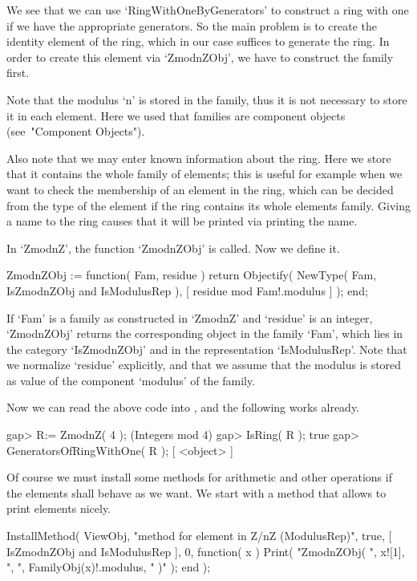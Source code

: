 We see that we can use `RingWithOneByGenerators' to construct a ring
with one if we have the appropriate generators.
So the main problem is to create the identity element of the ring,
which in our case suffices to generate the ring.
In order to create this element via `ZmodnZObj',
we have to construct the family first.

Note that the modulus `n' is stored in the family,
thus it is not necessary to store it in each element.
Here we used that families are component objects
(see~"Component Objects").

Also note that we may enter known information about the ring.
Here we store that it contains the whole family of elements;
this is useful for example when we want to check the membership of an
element in the ring, which can be decided from the type of the element
if the ring contains its whole elements family.
Giving a name to the ring causes that it will be printed
via printing the name.

In `ZmodnZ', the function `ZmodnZObj' is called.
Now we define it.

\begintt
    ZmodnZObj := function( Fam, residue )
        return Objectify( NewType( Fam, IsZmodnZObj and IsModulusRep ),
                          [ residue mod Fam!.modulus ] );
    end;
\endtt

If `Fam' is a family as constructed in `ZmodnZ'
and `residue' is an integer,
`ZmodnZObj' returns the corresponding object in the family `Fam',
which lies in the category `IsZmodnZObj' and in the representation
`IsModulusRep'.
Note that we normalize `residue' explicitly,
and that we assume that the modulus is stored as value of the component
`modulus' of the family.

Now we can read the above code into {\GAP},
and the following works already.

\begintt
    gap> R:= ZmodnZ( 4 );
    (Integers mod 4)
    gap> IsRing( R );
    true
    gap> GeneratorsOfRingWithOne( R );
    [ <object> ]
\endtt

Of course we must install some methods for arithmetic and other
operations if the elements shall behave as we want.
We start with a method that allows to print elements nicely.

\begintt
    InstallMethod( ViewObj,
        "method for element in Z/nZ (ModulusRep)",
        true,
        [ IsZmodnZObj and IsModulusRep ], 0,
        function( x )
        Print( "ZmodnZObj( ", x![1], ", ", FamilyObj(x)!.modulus, " )" );
        end );
\endtt


